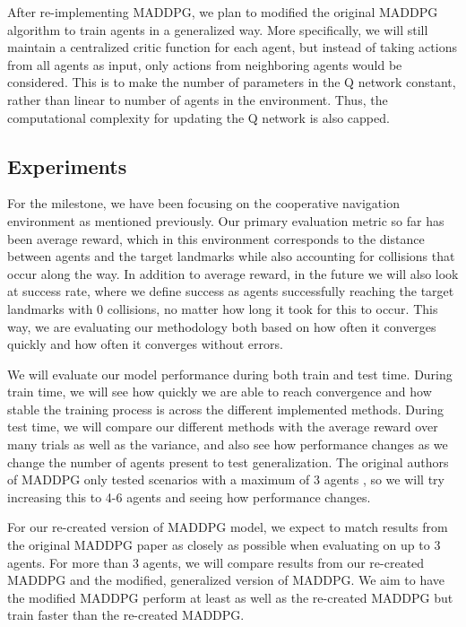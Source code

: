 \documentclass{article}
\begin{document}
After re-implementing MADDPG, we plan to modified the original MADDPG algorithm to train agents in a generalized way. More specifically, we will still maintain a centralized critic function for each agent, but instead of taking actions from all agents as input, only actions from neighboring agents would be considered. This is to make the number of parameters in the Q network constant, rather than linear to number of agents in the environment. Thus, the computational complexity for updating the Q network is also capped.

\subsection{Experiments}

For the milestone, we have been focusing on the cooperative navigation environment as mentioned previously. Our primary evaluation metric so far has been average reward, which in this environment corresponds to the distance between agents and the target landmarks while also accounting for collisions that occur along the way. In addition to average reward, in the future we will also look at success rate, where we define success as agents successfully reaching the target landmarks with 0 collisions, no matter how long it took for this to occur. This way, we are evaluating our methodology both based on how often it converges quickly and how often it converges without errors.

We will evaluate our model performance during both train and test time. During train time, we will see how quickly we are able to reach convergence and how stable the training process is across the different implemented methods. During test time, we will compare our different methods with the average reward over many trials as well as the variance, and also see how performance changes as we change the number of agents present to test generalization. The original authors of MADDPG only tested scenarios with a maximum of 3 agents , so we will try increasing this to 4-6 agents and seeing how performance changes.

For our re-created version of MADDPG model, we expect to match results from the original MADDPG paper as closely as possible when evaluating on up to 3 agents. For more than 3 agents, we will compare results from our re-created MADDPG and the modified, generalized version of MADDPG. We aim to have the modified MADDPG perform at least as well as the re-created MADDPG but train faster than the re-created MADDPG.
\end{document}
